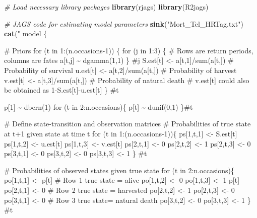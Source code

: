 \documentclass[
]{krantz}
\makeatletter
\newenvironment{Shaded}{\begin{snugshade}}{\end{snugshade}}
\newcommand{\CommentTok}[1]{\textcolor[rgb]{0.37,0.37,0.37}{\textit{#1}}}
\newcommand{\FunctionTok}[1]{\textcolor[rgb]{0.27,0.27,0.27}{\textbf{#1}}}
\newcommand{\NormalTok}[1]{#1}
\newcommand{\StringTok}[1]{\textcolor[rgb]{0.5,0.5,0.5}{#1}}
\newenvironment{kframe}{%
\medskip{}
\setlength{\fboxsep}{.8em}
 \def\at@end@of@kframe{}%
 \ifinner\ifhmode%
  \def\at@end@of@kframe{\end{minipage}}%
  \begin{minipage}{\columnwidth}%
 \fi\fi%
 \def\FrameCommand##1{\hskip\@totalleftmargin \hskip-\fboxsep
 \colorbox{shadecolor}{##1}\hskip-\fboxsep
     \hskip-\linewidth \hskip-\@totalleftmargin \hskip\columnwidth}%
 \MakeFramed {\advance\hsize-\width
   \@totalleftmargin\z@ \linewidth\hsize
   \@setminipage}}%
 {\par\unskip\endMakeFramed%
 \at@end@of@kframe}
\renewenvironment{Shaded}{\begin{kframe}}{\end{kframe}}
\makeatother
\begin{document}
\begin{Shaded}
\begin{Highlighting}[]
\CommentTok{\# Load necessary library packages}
\FunctionTok{library}\NormalTok{(rjags)}
\FunctionTok{library}\NormalTok{(R2jags)}

\CommentTok{\# JAGS code for estimating model parameters}
\FunctionTok{sink}\NormalTok{(}\StringTok{"Mort\_Tel\_HRTag.txt"}\NormalTok{)}
\FunctionTok{cat}\NormalTok{(}\StringTok{"}
\StringTok{model \{}

\StringTok{\# Priors}
\StringTok{for (t in 1:(n.occasions{-}1)) \{}
\StringTok{     for (j in 1:3) \{ \# Rows are return periods, columns are fates}
\StringTok{         a[t,j] \textasciitilde{} dgamma(1,1)}
\StringTok{         \} \#j}
\StringTok{     S.est[t] \textless{}{-} a[t,1]/sum(a[t,]) \# Probability of survival}
\StringTok{     u.est[t] \textless{}{-} a[t,2]/sum(a[t,]) \# Probability of harvest}
\StringTok{     v.est[t] \textless{}{-} a[t,3]/sum(a[t,]) \# Probability of natural death}
\StringTok{     \# v.est[t] could also be obtained as 1{-}S.est[t]{-}u.est[t]}
\StringTok{    \} \#t}

\StringTok{  p[1] \textasciitilde{} dbern(1)}
\StringTok{  for (t in 2:n.occasions)\{}
\StringTok{    p[t] \textasciitilde{} dunif(0,1)}
\StringTok{    \}\#t}

\StringTok{\# Define state{-}transition and observation matrices}
\StringTok{\# Probabilities of true state at t+1 given state at time t}
\StringTok{    for (t in 1:(n.occasions{-}1))\{}
\StringTok{    ps[1,t,1] \textless{}{-} S.est[t]}
\StringTok{    ps[1,t,2] \textless{}{-} u.est[t]}
\StringTok{    ps[1,t,3] \textless{}{-} v.est[t]}
\StringTok{    ps[2,t,1] \textless{}{-} 0}
\StringTok{    ps[2,t,2] \textless{}{-} 1}
\StringTok{    ps[2,t,3] \textless{}{-} 0}
\StringTok{    ps[3,t,1] \textless{}{-} 0}
\StringTok{    ps[3,t,2] \textless{}{-} 0}
\StringTok{    ps[3,t,3] \textless{}{-} 1}
\StringTok{    \} \#t}

\StringTok{\# Probabilities of observed states given true state}
\StringTok{    for (t in 2:n.occasions)\{}
\StringTok{    po[1,t,1] \textless{}{-} p[t]  \# Row 1 true state = alive}
\StringTok{    po[1,t,2] \textless{}{-} 0}
\StringTok{    po[1,t,3] \textless{}{-} 1{-}p[t]}
\StringTok{    po[2,t,1] \textless{}{-} 0     \# Row 2 true state = harvested}
\StringTok{    po[2,t,2] \textless{}{-} 1}
\StringTok{    po[2,t,3] \textless{}{-} 0}
\StringTok{    po[3,t,1] \textless{}{-} 0     \# Row 3 true state= natural death}
\StringTok{    po[3,t,2] \textless{}{-} 0}
\StringTok{    po[3,t,3] \textless{}{-} 1}
\StringTok{    \} \#t}


\end{Highlighting}
\end{Shaded}
\end{document}
